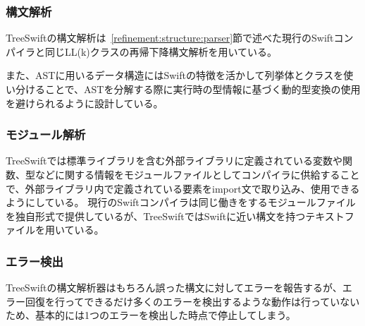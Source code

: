 \subsubsection{構文解析}

TreeSwiftの構文解析は~\ref{refinement:structure:parser}節で述べた現行のSwiftコンパイラと同じLL(k)クラスの再帰下降構文解析を用いている。

また、ASTに用いるデータ構造にはSwiftの特徴を活かして列挙体とクラスを使い分けることで、ASTを分解する際に実行時の型情報に基づく動的型変換の使用を避けられるように設計している。

\subsubsection{モジュール解析}

TreeSwiftでは標準ライブラリを含む外部ライブラリに定義されている変数や関数、型などに関する情報をモジュールファイルとしてコンパイラに供給することで、外部ライブラリ内で定義されている要素をimport文で取り込み、使用できるようにしている。
現行のSwiftコンパイラは同じ働きをするモジュールファイルを独自形式で提供しているが、TreeSwiftではSwiftに近い構文を持つテキストファイルを用いている。

\subsubsection{エラー検出}

TreeSwiftの構文解析器はもちろん誤った構文に対してエラーを報告するが、エラー回復を行ってできるだけ多くのエラーを検出するような動作は行っていないため、基本的には1つのエラーを検出した時点で停止してしまう。

